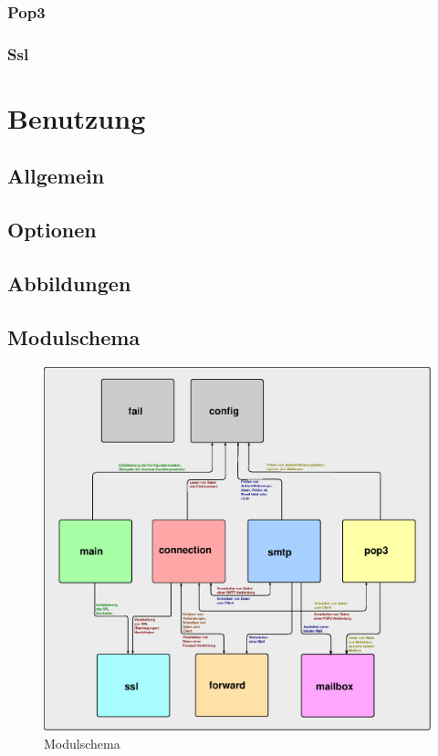 \documentclass[final,a4paper,11pt,notitlepage,halfparskip]{scrreprt}
\begin{document}
\subsection{Pop3}


\subsection{Ssl}

\chapter{Benutzung}

\section{Allgemein}
\section{Optionen}

\pagebreak

\begin{appendix}
  \chapter{Abbildungen}
  \section{Modulschema}
  \begin{figure}[htb]
    \includegraphics[width=\textwidth]{schema.eps}
    \caption{Modulschema}
    \label{fig:schema}
  \end{figure}
\end{appendix}
\end{document}
